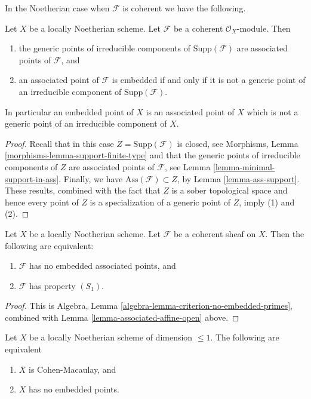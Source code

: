 \noindent
In the Noetherian case when $\mathcal{F}$ is coherent we have
the following.

\begin{lemma}
\label{lemma-embedded}
Let $X$ be a locally Noetherian scheme.
Let $\mathcal{F}$ be a coherent $\mathcal{O}_X$-module.
Then
\begin{enumerate}
\item the generic points of irreducible components of
$\text{Supp}(\mathcal{F})$ are associated points of $\mathcal{F}$, and
\item an associated point of $\mathcal{F}$ is embedded if and only
if it is not a generic point of an irreducible component
of $\text{Supp}(\mathcal{F})$.
\end{enumerate}
In particular an embedded point of $X$ is an associated point of $X$
which is not a generic point of an irreducible component of $X$.
\end{lemma}

\begin{proof}
Recall that in this case $Z = \text{Supp}(\mathcal{F})$ is closed, see
Morphisms, Lemma \ref{morphisms-lemma-support-finite-type}
and that the generic points of irreducible components of $Z$ are
associated points of $\mathcal{F}$, see
Lemma \ref{lemma-minimal-support-in-ass}.
Finally, we have $\text{Ass}(\mathcal{F}) \subset Z$, by
Lemma \ref{lemma-ass-support}.
These results, combined with the fact that $Z$ is a sober topological
space and hence every point of $Z$ is a specialization of a generic
point of $Z$, imply (1) and (2).
\end{proof}

\begin{lemma}
\label{lemma-S1-no-embedded}
Let $X$ be a locally Noetherian scheme.
Let $\mathcal{F}$ be a coherent sheaf on $X$.
Then the following are equivalent:
\begin{enumerate}
\item $\mathcal{F}$ has no embedded associated points, and
\item $\mathcal{F}$ has property $(S_1)$.
\end{enumerate}
\end{lemma}

\begin{proof}
This is Algebra, Lemma \ref{algebra-lemma-criterion-no-embedded-primes},
combined with Lemma \ref{lemma-associated-affine-open} above.
\end{proof}

\begin{lemma}
\label{lemma-noetherian-dim-1-CM-no-embedded-points}
Let $X$ be a locally Noetherian scheme of dimension $\leq 1$.
The following are equivalent
\begin{enumerate}
\item $X$ is Cohen-Macaulay, and
\item $X$ has no embedded points.
\end{enumerate}
\end{lemma}

